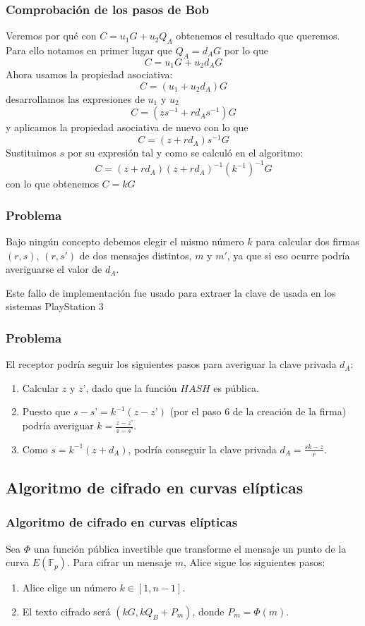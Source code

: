 \documentclass[xcolor=x11names,compress,utf8, 9pt]{beamer}
\begin{document}
\begin{frame}\frametitle{Comprobación de los pasos de Bob}
Veremos por qué con $C=u_1G+u_2Q_A$ obtenemos el resultado que queremos. Para ello notamos en primer lugar que $Q_A=d_AG$ por lo que
$$C=u_1G+u_2d_AG$$
Ahora usamos la propiedad asociativa:
$$C = (u_1+u_2d_A)G$$
desarrollamos las expresiones de $u_1$ y $u_2$
$$C = (zs^{-1}+rd_As^{-1})G$$
y aplicamos la propiedad asociativa de nuevo con lo que
$$C = (z+rd_A)s^{-1}G$$
Sustituimos $s$ por su expresión tal y como se calculó en el
algoritmo:
$$C = (z+rd_A)(z+rd_A)^{-1}(k^{-1})^{-1}G$$
con lo que obtenemos $C = kG$
\end{frame}

\begin{frame}\frametitle{Problema}
  Bajo ningún concepto debemos elegir el mismo número $k$ para calcular dos firmas $(r, s)$, $(r, s')$ de dos mensajes distintos, $m$ y $m'$, ya que si eso ocurre podría averiguarse el
valor de $d_A$.

Este fallo de implementación fue usado para extraer la clave de usada
en los sistemas PlayStation 3
\end{frame}

\begin{frame}\frametitle{Problema}
  El receptor podría seguir los siguientes pasos para averiguar la clave privada $d_A$:
  \begin{enumerate}
  \item Calcular $z$ y $z’$, dado que la función $HASH$ es pública.
  \item Puesto que $s-s’ = k^{-1}(z-z’)$ (por el paso 6 de la creación de la firma) podría averiguar $k = \frac{z-z’}{s-s’}$.
  \item Como $s = k^{-1}(z+d_A)$, podría conseguir la clave privada $d_A = \frac{sk-z}{r}$.
 \end{enumerate}
\end{frame}

\subsection{Algoritmo de cifrado en curvas elípticas}

\begin{frame}\frametitle{Algoritmo de cifrado en curvas elípticas}
  Sea $\Phi$ una función pública invertible que transforme el mensaje un
punto de la curva $E(\mathbb{F}_p)$. Para cifrar un mensaje $m$, Alice
sigue los siguientes pasos:

\begin{enumerate}
\item Alice elige un número $k \in [1, n-1]$.
\item El texto cifrado será $(kG, kQ_B+P_m)$, donde $P_m = \Phi(m)$.
\end{enumerate}
\end{frame}
\end{document}
